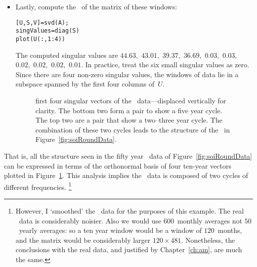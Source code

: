 \begin{example}
\begin{itemize}
\item Lastly, compute the \svd\ of the matrix of these windows:
\begin{verbatim}
[U,S,V]=svd(A);
singValues=diag(S)
plot(U(:,1:4))
\end{verbatim}
\setbox\ajrqrbox\hbox{}%
\marginpar{\usebox{\ajrqrbox}}%
The computed singular values are $44.63,$ $43.01,$ $39.37,$ $36.69,$ $0.03,$ $0.03,$ $0.02,$ $0.02,$ $0.02,$ $0.01$.
In practice, treat the six small singular values as zero.
Since there are four non-zero singular values, the windows of data lie in a subspace spanned by the first four columns of~\(U\).
\begin{figure}
\centering

\caption{first four singular vectors of the \soi\ data---displaced vertically for clarity.  The bottom two form a pair to show a five year cycle.  The top two are a pair that show a two--three year cycle.  The combination of these two cycles leads to the structure of the \soi\ in Figure~\ref{fig:soiRoundData}.}
\label{fig:soiRoundSubs}
\end{figure}%
\end{itemize}
That is, all the structure seen in the fifty year \soi\ data of Figure~\ref{fig:soiRoundData} can be expressed in terms of the  orthonormal basis of four ten-year vectors plotted in Figure~\ref{fig:soiRoundSubs}.
This analysis implies the \soi\ data is composed of two cycles of different frequencies.%
\footnote{However, I `smoothed' the \soi\ data for the purposes of this example.  The real \soi\ data is considerably noisier.  Also we would use \(600\)~monthly averages not \(50\)~yearly averages: so a ten year window would be a window of \(120\)~months, and the matrix would be considerably larger \(120\times481\).  Nonetheless, the conclusions with the real data, and justified by Chapter~\ref{ch:am}, are much the same.}
\end{example}



